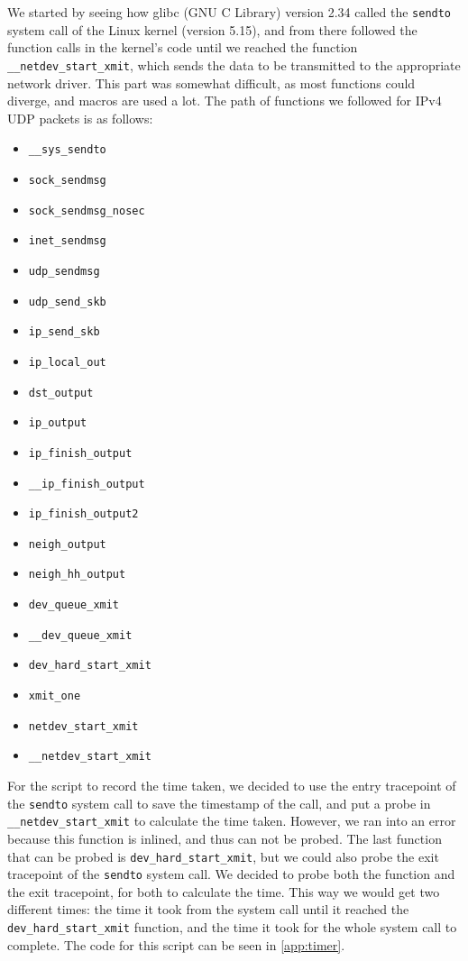 We started by seeing how glibc (GNU C Library) version 2.34 called the
\texttt{sendto} system call of the Linux kernel (version 5.15), and from there
followed the function calls in the kernel's code until we reached the function
\texttt{\_\_netdev\_start\_xmit}, which sends the data to be transmitted to the
appropriate network driver. This part was somewhat difficult, as most functions
could diverge, and macros are used a lot. The path of functions we followed for
IPv4 \ac{UDP} packets is as follows:
\begin{itemize}
    \item \texttt{\_\_sys\_sendto}
    \item \texttt{sock\_sendmsg}
    \item \texttt{sock\_sendmsg\_nosec}
    \item \texttt{inet\_sendmsg}
    \item \texttt{udp\_sendmsg}
    \item \texttt{udp\_send\_skb}
    \item \texttt{ip\_send\_skb}
    \item \texttt{ip\_local\_out}
    \item \texttt{dst\_output}
    \item \texttt{ip\_output}
    \item \texttt{ip\_finish\_output}
    \item \texttt{\_\_ip\_finish\_output}
    \item \texttt{ip\_finish\_output2}
    \item \texttt{neigh\_output}
    \item \texttt{neigh\_hh\_output}
    \item \texttt{dev\_queue\_xmit}
    \item \texttt{\_\_dev\_queue\_xmit}
    \item \texttt{dev\_hard\_start\_xmit}
    \item \texttt{xmit\_one}
    \item \texttt{netdev\_start\_xmit}
    \item \texttt{\_\_netdev\_start\_xmit}
\end{itemize}
For the script to record the time taken, we decided to use the entry tracepoint
of the \texttt{sendto} system call to save the timestamp of the call, and put a
probe in \texttt{\_\_netdev\_start\_xmit} to calculate the time taken. However,
we ran into an error because this function is inlined, and thus can not be
probed. The last function that can be probed is \texttt{dev\_hard\_start\_xmit},
but we could also probe the exit tracepoint of the \texttt{sendto} system call.
We decided to probe both the function and the exit tracepoint, for both to
calculate the time. This way we would get two different times: the time it took
from the system call until it reached the \texttt{dev\_hard\_start\_xmit}
function, and the time it took for the whole system call to complete. The code
for this script can be seen in \autoref{app:timer}.


